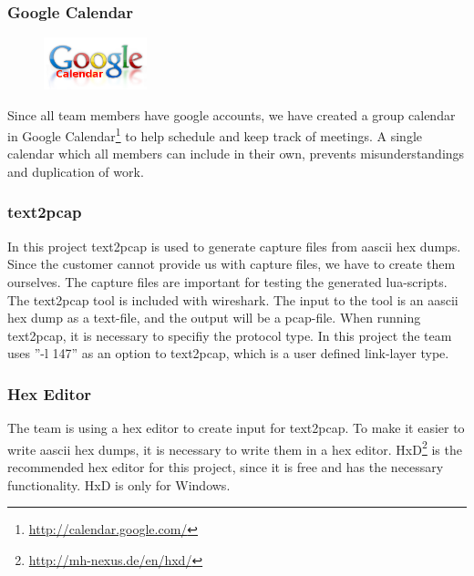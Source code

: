 \subsubsection{Google Calendar}
\begin{figure}
	\vspace{-20pt}
	\includegraphics[width=3cm]{./planning/img/google_calendar_logo}
	\vspace{-20pt}
\end{figure}
Since all team members have google accounts, we have created a group calendar
in Google Calendar\footnote{\url{http://calendar.google.com/}}
to help schedule and keep track of meetings. A single calendar which all
members can include in their own, prevents misunderstandings and duplication
of work.

\subsubsection{text2pcap}
In this project text2pcap is used to generate capture files from \gls{aascii}
\glspl{hex dump}. Since the customer cannot provide us with capture files, 
we have to create them ourselves. The capture files are important for testing
the generated \Gls{lua}-\glspl{script}. The text2pcap tool is included with \Gls{wireshark}. 
The input to the tool is an \gls{aascii} \gls{hex dump} as a text-file, and the output will
be a \gls{pcap-file}. When running text2pcap, it is necessary to specifiy the \gls{protocol}
type. In this project the team uses ''-l 147'' as an option to text2pcap,
which is a user defined \gls{link-layer} type.

\subsubsection{Hex Editor}
The team is using a hex editor to create input for text2pcap. To make it
easier to write \gls{aascii} \glspl{hex dump}, it is necessary to write them in a hex editor.
HxD\footnote{\url{http://mh-nexus.de/en/hxd/}} is the recommended hex editor
for this project, since it is free and has the necessary functionality. HxD is
only for Windows.


